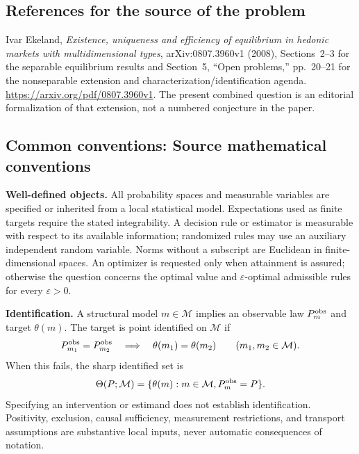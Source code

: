 \documentclass[11pt,a4paper]{article}
\begin{document}
\subsection*{References for the source of the problem}
Ivar Ekeland, \emph{Existence, uniqueness and efficiency of equilibrium in hedonic markets with multidimensional types}, arXiv:0807.3960v1 (2008), Sections~2--3 for the separable equilibrium results and Section~5, ``Open problems,'' pp.~20--21 for the nonseparable extension and characterization/identification agenda. \url{https://arxiv.org/pdf/0807.3960v1}. The present combined question is an editorial formalization of that extension, not a numbered conjecture in the paper.

\subsection*{Common conventions: Source mathematical conventions}

\textbf{Well-defined objects.}
All probability spaces and measurable variables are specified or inherited
from a local statistical model. Expectations used as finite targets require
the stated integrability. A decision rule or estimator is measurable with
respect to its available information; randomized rules may use an auxiliary
independent random variable. Norms without a subscript are Euclidean in
finite-dimensional spaces. An optimizer is requested only when attainment
is assured; otherwise the question concerns the optimal value and
$\varepsilon$-optimal admissible rules for every $\varepsilon>0$.

\textbf{Identification.}
A structural model $m\in\mathcal M$ implies an observable law
$P_m^{\rm obs}$ and target $\theta(m)$. The target is point identified on
$\mathcal M$ if
\[
 P_{m_1}^{\rm obs}=P_{m_2}^{\rm obs}
 \quad\Longrightarrow\quad\theta(m_1)=\theta(m_2)
 \qquad(m_1,m_2\in\mathcal M).
\]
When this fails, the sharp identified set is
\[
 \Theta(P;\mathcal M)=\{\theta(m):m\in\mathcal M,
                                  P_m^{\rm obs}=P\}.
\]
Specifying an intervention or estimand does not establish identification.
Positivity, exclusion, causal sufficiency, measurement restrictions, and
transport assumptions are substantive local inputs, never automatic
consequences of notation.
\end{document}
